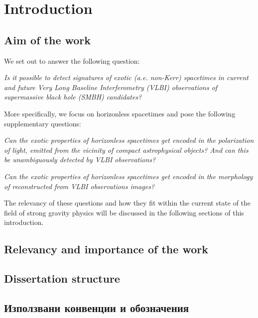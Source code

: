 \section{Introduction}

\subsection{Aim of the work}

We set out to answer the following question:
\newline

\emph{Is it possible to detect signatures of exotic (a.e. non-Kerr) spacetimes in current and future Very Long Baseline Interferometry (VLBI) observations of supermassive black hole (SMBH) candidates?}
\newline

More specifically, we focus on horizonless spacetimes and pose the following supplementary questions:
\newline

\emph{Can the exotic properties of horizonless spacetimes get encoded in the polarization of light, emitted from the vicinity of compact astrophysical objects? And can this be unambiguously detected by VLBI observations?}
\newline

\emph{Can the exotic properties of horizonless spacetimes get encoded in the morphology of reconstructed from VLBI observations images?}
\newline

The relevancy of these questions and how they fit within the current state of the field of strong gravity physics will be discussed in the following sections of this introduction. 

\subsection{Relevancy and importance of the work}



\subsection{Dissertation structure}

\subsection{Използвани конвенции и обозначения}
